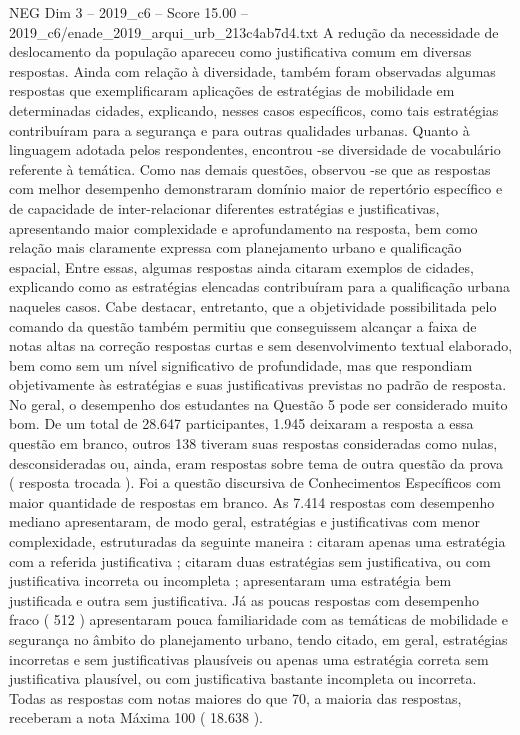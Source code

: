 \begin{textsample}{NEG Dim 3 – 2019\_c6 – Score 15.00 – 2019\_c6/enade\_2019\_arqui\_urb\_213c4ab7d4.txt}
A redução da necessidade de deslocamento da população apareceu como justificativa comum em diversas respostas.
Ainda com relação à diversidade, também foram observadas algumas respostas que exemplificaram aplicações de estratégias de mobilidade em determinadas cidades, explicando, nesses casos específicos, como tais estratégias contribuíram para a segurança e para outras qualidades urbanas.
Quanto à linguagem adotada pelos respondentes, encontrou -se diversidade de vocabulário referente à temática.
Como nas demais questões, observou -se que as respostas com melhor desempenho demonstraram domínio maior de repertório específico e de capacidade de inter-relacionar diferentes estratégias e justificativas, apresentando maior complexidade e aprofundamento na resposta, bem como relação mais claramente expressa com planejamento urbano e qualificação espacial, Entre essas, algumas respostas ainda citaram exemplos de cidades, explicando como as estratégias elencadas contribuíram para a qualificação urbana naqueles casos.
Cabe destacar, entretanto, que a objetividade possibilitada pelo comando da questão também permitiu que conseguissem alcançar a faixa de notas altas na correção respostas curtas e sem desenvolvimento textual elaborado, bem como sem um nível significativo de profundidade, mas que respondiam objetivamente às estratégias e suas justificativas previstas no padrão de resposta.
No geral, o desempenho dos estudantes na Questão 5 pode ser considerado muito bom.
De um total de 28.647 participantes, 1.945 deixaram a resposta a essa questão em branco, outros 138 tiveram suas respostas consideradas como nulas, desconsideradas ou, ainda, eram respostas sobre tema de outra questão da prova ( resposta trocada ).
Foi a questão discursiva de Conhecimentos Específicos com maior quantidade de respostas em branco.
As 7.414 respostas com desempenho mediano apresentaram, de modo geral, estratégias e justificativas com menor complexidade, estruturadas da seguinte maneira : citaram apenas uma estratégia com a referida justificativa ; citaram duas estratégias sem justificativa, ou com justificativa incorreta ou incompleta ; apresentaram uma estratégia bem justificada e outra sem justificativa.
Já as poucas respostas com desempenho fraco ( 512 ) apresentaram pouca familiaridade com as temáticas de mobilidade e segurança no âmbito do planejamento urbano, tendo citado, em geral, estratégias incorretas e sem justificativas plausíveis ou apenas uma estratégia correta sem justificativa plausível, ou com justificativa bastante incompleta ou incorreta.
Todas as respostas com notas maiores do que 70, a maioria das respostas, receberam a nota Máxima 100 ( 18.638 ).

\end{textsample}

